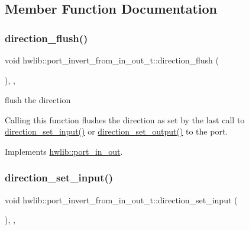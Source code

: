 \subsection{Member Function Documentation}
\mbox{\label{classhwlib_1_1port__invert__from__in__out__t_a85f7917e1b70d8eb637aede9040d2d00}} 
\subsubsection{\texorpdfstring{direction\+\_\+flush()}{direction\_flush()}}
{\footnotesize\ttfamily void hwlib\+::port\+\_\+invert\+\_\+from\+\_\+in\+\_\+out\+\_\+t\+::direction\+\_\+flush (\begin{DoxyParamCaption}{ }\end{DoxyParamCaption})\hspace{0.3cm}{\ttfamily [inline]}, {\ttfamily [override]}, {\ttfamily [virtual]}}

flush the direction

Calling this function flushes the direction as set by the last call to \hyperlink{classhwlib_1_1port__invert__from__in__out__t_a5af46d9dbe68de372e99ffea6617cb34}{direction\+\_\+set\+\_\+input()} or \hyperlink{classhwlib_1_1port__invert__from__in__out__t_a081fcd37931c8b02a8bcc61899ea5346}{direction\+\_\+set\+\_\+output()} to the port. 

Implements \hyperlink{classhwlib_1_1port__in__out_a431b79eee48a21a93978bfdf6620f800}{hwlib\+::port\+\_\+in\+\_\+out}.

\mbox{\label{classhwlib_1_1port__invert__from__in__out__t_a5af46d9dbe68de372e99ffea6617cb34}} 
\subsubsection{\texorpdfstring{direction\+\_\+set\+\_\+input()}{direction\_set\_input()}}
{\footnotesize\ttfamily void hwlib\+::port\+\_\+invert\+\_\+from\+\_\+in\+\_\+out\+\_\+t\+::direction\+\_\+set\+\_\+input (\begin{DoxyParamCaption}{ }\end{DoxyParamCaption})\hspace{0.3cm}{\ttfamily [inline]}, {\ttfamily [override]}, {\ttfamily [virtual]}}

